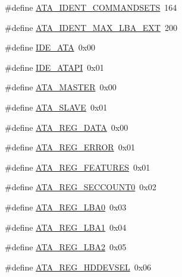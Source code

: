 \begin{DoxyCompactItemize}
\item 
\#define \hyperlink{a00023_a8536e132f24aa36e826f753b6061e8ea_a8536e132f24aa36e826f753b6061e8ea}{A\+T\+A\+\_\+\+I\+D\+E\+N\+T\+\_\+\+C\+O\+M\+M\+A\+N\+D\+S\+E\+TS}~164
\item 
\#define \hyperlink{a00023_aa1926c13a31f512c9ec07ed3bdba8893_aa1926c13a31f512c9ec07ed3bdba8893}{A\+T\+A\+\_\+\+I\+D\+E\+N\+T\+\_\+\+M\+A\+X\+\_\+\+L\+B\+A\+\_\+\+E\+XT}~200
\item 
\#define \hyperlink{a00023_a3046279f2a25227c121b69f4cf855bf8_a3046279f2a25227c121b69f4cf855bf8}{I\+D\+E\+\_\+\+A\+TA}~0x00
\item 
\#define \hyperlink{a00023_a6513ee2a4da2c6aaa691b9d4c639a53e_a6513ee2a4da2c6aaa691b9d4c639a53e}{I\+D\+E\+\_\+\+A\+T\+A\+PI}~0x01
\item 
\#define \hyperlink{a00023_acb5691a26e836afc6972577bd71b0d97_acb5691a26e836afc6972577bd71b0d97}{A\+T\+A\+\_\+\+M\+A\+S\+T\+ER}~0x00
\item 
\#define \hyperlink{a00023_abe2ab9064f7100c5915bc694386a3e40_abe2ab9064f7100c5915bc694386a3e40}{A\+T\+A\+\_\+\+S\+L\+A\+VE}~0x01
\item 
\#define \hyperlink{a00023_a359c566cefff5e671eb3bae72e0d0948_a359c566cefff5e671eb3bae72e0d0948}{A\+T\+A\+\_\+\+R\+E\+G\+\_\+\+D\+A\+TA}~0x00
\item 
\#define \hyperlink{a00023_ad2f2744a08145beb17b7ed6ca0465d85_ad2f2744a08145beb17b7ed6ca0465d85}{A\+T\+A\+\_\+\+R\+E\+G\+\_\+\+E\+R\+R\+OR}~0x01
\item 
\#define \hyperlink{a00023_aa2dc5ed9bf4786f687e4000243f6a21d_aa2dc5ed9bf4786f687e4000243f6a21d}{A\+T\+A\+\_\+\+R\+E\+G\+\_\+\+F\+E\+A\+T\+U\+R\+ES}~0x01
\item 
\#define \hyperlink{a00023_ad995693d31857a8e514b5f96c5fc4cdb_ad995693d31857a8e514b5f96c5fc4cdb}{A\+T\+A\+\_\+\+R\+E\+G\+\_\+\+S\+E\+C\+C\+O\+U\+N\+T0}~0x02
\item 
\#define \hyperlink{a00023_a9818e533e211e2ddadf650dab77f55fd_a9818e533e211e2ddadf650dab77f55fd}{A\+T\+A\+\_\+\+R\+E\+G\+\_\+\+L\+B\+A0}~0x03
\item 
\#define \hyperlink{a00023_a4ca55ad2c56ea915f9dcde1aba57433d_a4ca55ad2c56ea915f9dcde1aba57433d}{A\+T\+A\+\_\+\+R\+E\+G\+\_\+\+L\+B\+A1}~0x04
\item 
\#define \hyperlink{a00023_afaf134917cbfc81c86b4e1d67930757a_afaf134917cbfc81c86b4e1d67930757a}{A\+T\+A\+\_\+\+R\+E\+G\+\_\+\+L\+B\+A2}~0x05
\item 
\#define \hyperlink{a00023_af80b9f0d852148eda227b433f72ca8bb_af80b9f0d852148eda227b433f72ca8bb}{A\+T\+A\+\_\+\+R\+E\+G\+\_\+\+H\+D\+D\+E\+V\+S\+EL}~0x06

\end{DoxyCompactItemize}
